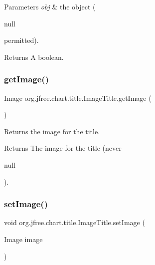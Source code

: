 \begin{DoxyParams}{Parameters}
{\em obj} & the object (
\begin{DoxyCode}
null 
\end{DoxyCode}
 permitted).\\
\hline
\end{DoxyParams}
\begin{DoxyReturn}{Returns}
A boolean. 
\end{DoxyReturn}
\mbox{\label{classorg_1_1jfree_1_1chart_1_1title_1_1_image_title_ac14ca8152629076360eb04f0f93eb2ba}} 
\subsubsection{\texorpdfstring{get\+Image()}{getImage()}}
{\footnotesize\ttfamily Image org.\+jfree.\+chart.\+title.\+Image\+Title.\+get\+Image (\begin{DoxyParamCaption}{ }\end{DoxyParamCaption})}

Returns the image for the title.

\begin{DoxyReturn}{Returns}
The image for the title (never
\begin{DoxyCode}
null 
\end{DoxyCode}
 ). 
\end{DoxyReturn}
\mbox{\label{classorg_1_1jfree_1_1chart_1_1title_1_1_image_title_a1293428d9954c155e853daf43127995d}} 
\subsubsection{\texorpdfstring{set\+Image()}{setImage()}}
{\footnotesize\ttfamily void org.\+jfree.\+chart.\+title.\+Image\+Title.\+set\+Image (\begin{DoxyParamCaption}\item[{Image}]{image }\end{DoxyParamCaption})}

